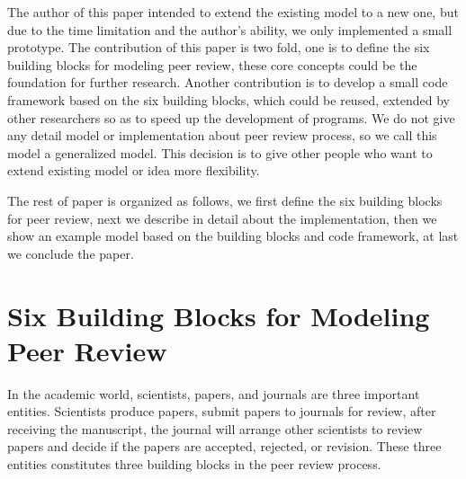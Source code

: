 \documentclass[11pt]{article}
\begin{document}
The author of this paper intended to extend the existing model to a new one, but due to the time limitation and the author's ability, we only implemented a small prototype. The contribution of this paper is two fold, one is to define the six building blocks for modeling peer review, these core concepts could be the foundation for further research. Another contribution is to develop a small code framework based on the six building blocks, which could be reused, extended by other researchers so as to speed up the development of programs. We do not give any detail model or implementation about peer review process, so we call this model a generalized model. This decision is to give other people who want to extend existing model or idea more flexibility.

The rest of paper is organized as follows, we first define the six building blocks for peer review, next we describe in detail about the implementation, then we show an example model based on the building blocks and code framework, at last we conclude the paper.

\newpage

\section{Six Building Blocks for Modeling Peer Review}


In the academic world, scientists, papers, and journals are three important entities. Scientists produce papers, submit papers to journals for review, after receiving the manuscript, the journal will arrange other scientists to review papers and decide if the papers are accepted, rejected, or revision. These three entities constitutes three building blocks in the peer review process.
\end{document}
